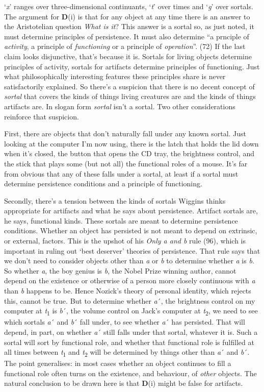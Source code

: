 \documentclass[
  11pt,
  letterpaper,
  DIV=11,
  numbers=noendperiod,
  twoside]{scrartcl}
\begin{document}
`\emph{x}' ranges over three-dimensional continuants, `\emph{t}' over
times and `\emph{g}' over sortals. The argument for \textbf{D}(i) is
that for any object at any time there is an answer to the Aristotelian
question \emph{What is it}? This answer is a sortal so, as just noted,
it must determine principles of persistence. It must also determine ``a
prnciple of \emph{activity}, a principle of \emph{functioning} or a
principle of \emph{operation}''. (72) If the last claim looks
disjunctive, that's because it is. Sortals for living objects determine
principles of activity, sortals for artifacts determine principles of
functioning. Just what philosophically interesting features these
principles share is never satisfactorily explained. So there's a
suspicion that there is no decent concept of \emph{sortal} that covers
the kinds of things living creatures are and the kinds of things
artifacts are. In slogan form \emph{sortal} isn't a sortal. Two other
considerations reinforce that suspicion.

First, there are objects that don't naturally fall under any known
sortal. Just looking at the computer I'm now using, there is the latch
that holds the lid down when it's closed, the button that opens the CD
tray, the brightness control, and the stick that plays some (but not
all) the functional roles of a mouse. It's far from obvious that any of
these falls under a sortal, at least if a sortal must determine
persistence conditions and a principle of functioning.

Secondly, there's a tension between the kinds of sortals Wiggins thinks
appropriate for artifacts and what he says about persistence. Artifact
sortals are, he says, functional kinds. These sortals are meant to
determine persistence conditions. Whether an object has persisted is not
meant to depend on extrinsic, or external, factors. This is the upshot
of his \emph{Only a and b} rule (96), which is important in ruling out
`best deserver' theories of persistence. That rule says that we don't
need to consider objects other than \emph{a} or \emph{b} to determine
whether \emph{a} is \emph{b}. So whether \emph{a}, the boy genius is
\emph{b}, the Nobel Prize winning author, cannot depend on the existence
or otherwise of a person more closely continuous with \emph{a} than
\emph{b} happens to be. Hence Nozick's theory of personal identity,
which rejects this, cannot be true. But to determine whether \emph{a}´,
the brightness control on my computer at \emph{t}\textsubscript{1} is
\emph{b}´, the volume control on Jack's computer at
\emph{t}\textsubscript{2}, we need to see which sortals \emph{a}´ and
\emph{b}´ fall under, to see whether \emph{a}´ has persisted. That will
depend, in part, on whether \emph{a}´ still falls under that sortal,
whatever it is. Such a sortal will sort by functional role, and whether
that functional role is fulfilled at all times between
\emph{t}\textsubscript{1} and \emph{t}\textsubscript{2} will be
determined by things other than \emph{a}´ and \emph{b}´. The point
generalises: in most cases whether an object continues to fill a
functional role often turns on the existence, and behaviour, of
\emph{other} objects. The natural conclusion to be drawn here is that
\textbf{D}(i) might be false for artifacts.
\end{document}
